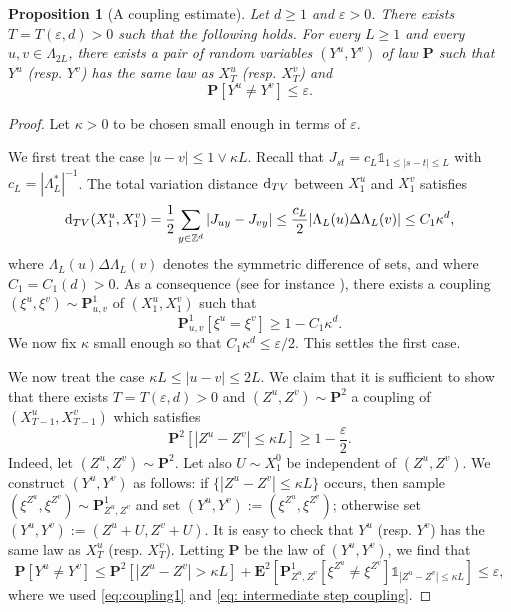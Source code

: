 \documentclass[11pt,a4paper]{article}
\numberwithin{equation}{section}
\theoremstyle{plain}
\newtheorem{Prop}[Thm]{Proposition}
\theoremstyle{definition}
\begin{document}
\begin{Prop}[A coupling estimate]\label{prop:coupling appendix} Let $d\geq 1$ and $\varepsilon>0$. There exists $T=T(\varepsilon,d)>0$ such that the following holds. For every $L\geq 1$ and every $u,v\in \Lambda_{2L}$, there exists a pair of random variables $(Y^u,Y^v)$ of law $\mathbf P$ such that $Y^u$ (resp. $Y^v$) has the same law as $X^u_T$ (resp. $X^v_T$) and
\begin{equation}
	\mathbf P[Y^u\neq Y^v]\leq \varepsilon.
\end{equation}
\end{Prop}

\begin{proof} Let $\kappa>0$ to be chosen small enough in terms of $\varepsilon$. 

We first treat the case $|u-v|\leq 1\vee \kappa L$. Recall that $J_{st}=c_L\mathds{1}_{1\leq |s-t|\leq L}$ with $c_L=|\Lambda_L^*|^{-1}$. The total variation distance $\mathrm{d}_{\rm TV}$ between $X_1^u$ and $X_1^v$ satisfies
\begin{equation}
	\mathrm{d}_{\rm TV}(X_1^u,X_1^v)=\frac{1}{2}\sum_{y\in \mathbb Z^d}|J_{uy}-J_{vy}|\leq \frac{c_L}{2}|\Lambda_L(u)\Delta\Lambda_L(v)|\leq C_1 \kappa^d,
\end{equation} 
where $\Lambda_L(u)\Delta\Lambda_L(v)$ denotes the symmetric difference of sets, and where $C_1=C_1(d)>0$. As a consequence (see for instance \cite[Appendix A.4.2]{LawlerLimicRandomWalks2010}), there exists a coupling $(\xi^u,\xi^v)\sim\mathbf P_{u,v}^1$ of $(X_1^u,X_1^v)$ such that
\begin{equation}\label{eq:coupling1}
	\mathbf P_{u,v}^1[\xi^u=\xi^v]\geq 1-C_1\kappa^d.
\end{equation}
We now fix $\kappa$ small enough so that $C_1\kappa^d\leq \varepsilon/2$. This settles the first case.

We now treat the case $\kappa L \leq |u-v|\leq 2L$. We claim that it is sufficient to show that there exists $T=T(\varepsilon,d)>0$ and $(Z^u,Z^v)\sim\mathbf P^2$ a coupling of $(X^u_{T-1},X_{T-1}^v)$ which satisfies
\begin{equation}\label{eq: intermediate step coupling}
	\mathbf P^2[|Z^u-Z^v|\leq\kappa L]\geq 1-\frac{\varepsilon}{2}.
\end{equation}
Indeed, let $(Z^u,Z^v)\sim \mathbf P^2$. Let also $U\sim X_1^0$ be independent of $(Z^u,Z^v)$. We construct $(Y^u,Y^v)$ as follows: if $\{|Z^u-Z^v|\leq \kappa L\}$ occurs, then sample $(\xi^{Z^u},\xi^{Z^v})\sim \mathbf P_{Z^u,Z^v}^1$ and set $(Y^u,Y^v):=(\xi^{Z^u},\xi^{Z^v})$; otherwise set $(Y^u,Y^v):=(Z^u+U,Z^v+U)$. It is easy to check that $Y^u$ (resp. $Y^v$) has the same law as $X_T^u$ (resp. $X_T^v$). Letting $\mathbf P$ be the law of $(Y^u,Y^v)$, we find that
\begin{equation}
	\mathbf P[Y^u\neq Y^v]\leq \mathbf P^2[|Z^u-Z^v|>\kappa L]+\mathbf E^2[\mathbf P^1_{Z^u,Z^v}[\xi^{Z^u} \neq \xi^{Z^v}]\mathds{1}_{|Z^u-Z^v|\leq \kappa L}]\leq \varepsilon,
\end{equation}
where we used \eqref{eq:coupling1} and \eqref{eq: intermediate step coupling}.
 

\end{proof}
\end{document}
